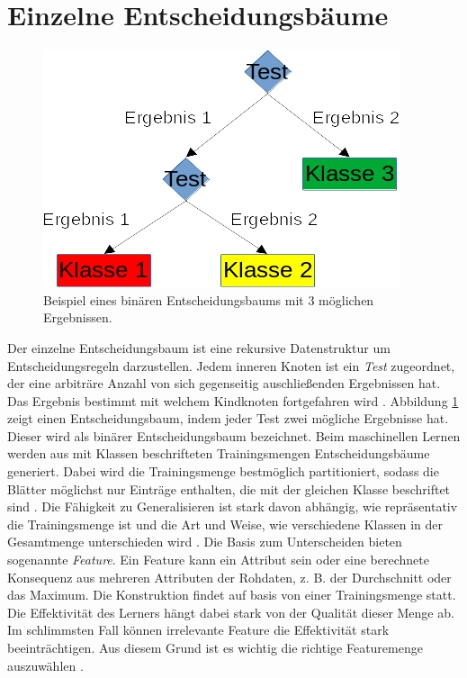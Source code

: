 \section{Einzelne Entscheidungsbäume}
\label{sec:construction}
\begin{figure}
    \centering
    \includegraphics[width=0.5\linewidth]{images/entscheidungsbaum.jpg}
    \caption{Beispiel eines binären Entscheidungsbaums mit 3 möglichen Ergebnissen.}
    \label{fig:entscheidungsbaum}
\end{figure}
Der einzelne Entscheidungsbaum ist eine rekursive Datenstruktur um Entscheidungsregeln darzustellen. Jedem inneren Knoten ist ein \textit{Test} zugeordnet, der eine arbiträre Anzahl von sich gegenseitig
auschließenden Ergebnissen hat. Das Ergebnis bestimmt mit welchem Kindknoten fortgefahren wird \cite{quinlan1990decision}. Abbildung \ref{fig:entscheidungsbaum} zeigt einen Entscheidungsbaum, indem jeder Test
zwei mögliche Ergebnisse hat. Dieser wird als binärer Entscheidungsbaum bezeichnet.
\newline
\newline
Beim maschinellen Lernen werden aus mit Klassen beschrifteten Trainingsmengen Entscheidungsbäume generiert. Dabei wird die Trainingsmenge bestmöglich partitioniert, sodass die Blätter möglichst nur Einträge
enthalten, die mit der gleichen Klasse beschriftet sind \cite{steinbergCART}.
\newline
\newline
Die Fähigkeit zu Generalisieren ist stark davon abhängig, wie repräsentativ die Trainingsmenge ist und die Art und Weise, wie verschiedene Klassen in der Gesamtmenge unterschieden wird \cite{steinbergCART}.
Die Basis zum Unterscheiden bieten sogenannte \textit{Feature}. Ein Feature kann ein Attribut sein oder eine berechnete Konsequenz aus mehreren Attributen der Rohdaten, z. B. der Durchschnitt oder das Maximum.
Die Konstruktion findet auf basis von einer Trainingsmenge statt. Die Effektivität des Lerners hängt dabei stark von der Qualität dieser Menge ab. Im schlimmsten Fall können irrelevante Feature die
Effektivität stark beeinträchtigen. Aus diesem Grund ist es wichtig die richtige Featuremenge auszuwählen \cite{pei1998feature}.
